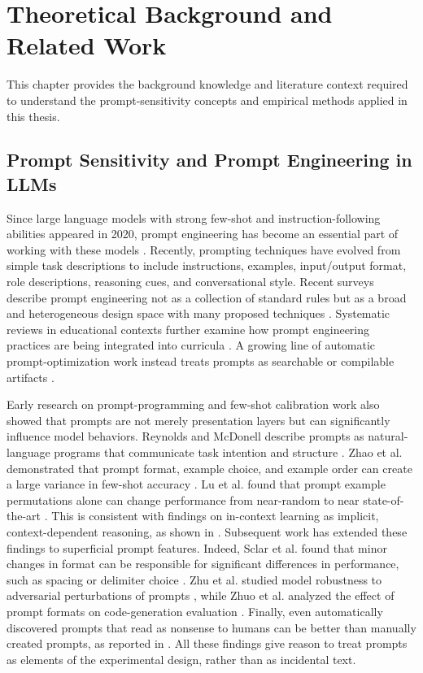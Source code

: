 \chapter{Theoretical Background and Related Work\label{cha:chapter2}}

This chapter provides the background knowledge and literature context required to understand the prompt-sensitivity concepts and empirical methods applied in this thesis.

\section{Prompt Sensitivity and Prompt Engineering in LLMs\label{sec:prompt-sensitivity}}

Since large language models with strong few-shot and instruction-following abilities appeared in 2020, prompt engineering has become an essential part of working with these models \cite{brown2020fewshot}. Recently, prompting techniques have evolved from simple task descriptions to include instructions, examples, input/output format, role descriptions, reasoning cues, and conversational style. Recent surveys describe prompt engineering not as a collection of standard rules but as a broad and heterogeneous design space with many proposed techniques \cite{schulhoff2024promptreport, zhao2023llmsurvey}. Systematic reviews in educational contexts further examine how prompt engineering practices are being integrated into curricula \cite{lee2025promptedu}. A growing line of automatic prompt-optimization work instead treats prompts as searchable or compilable artifacts \cite{pryzant2023apo, yang2023opro, khattab2023dspy}.

Early research on prompt-programming and few-shot calibration work also showed that prompts are not merely presentation layers but can significantly influence model behaviors. Reynolds and McDonell describe prompts as natural-language programs that communicate task intention and structure \cite{reynolds2021promptprogramming}. Zhao et al. demonstrated that prompt format, example choice, and example order can create a large variance in few-shot accuracy \cite{zhao2021calibrate}. Lu et al. found that prompt example permutations alone can change performance from near-random to near state-of-the-art \cite{lu2021fantastically}. This is consistent with findings on in-context learning as implicit, context-dependent reasoning, as shown in \cite{xie2022icl}. Subsequent work has extended these findings to superficial prompt features. Indeed, Sclar et al. found that minor changes in format can be responsible for significant differences in performance, such as spacing or delimiter choice \cite{sclar2023spurious}. Zhu et al. studied model robustness to adversarial perturbations of prompts \cite{zhu2023promptrobust}, while Zhuo et al. analyzed the effect of prompt formats on code-generation evaluation \cite{zhuo2024prosa}. Finally, even automatically discovered prompts that read as nonsense to humans can be better than manually created prompts, as reported in \cite{battle2024eccentric}. All these findings give reason to treat prompts as elements of the experimental design, rather than as incidental text.

